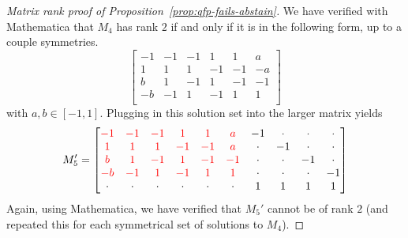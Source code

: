 \documentclass[anon]{colt2020} %
\newcommand{\Comments}{1}
\newcommand{\mynote}[2]{\ifnum\Comments=1\textcolor{#1}{#2}\fi}
\newcommand{\jessie}[1]{\mynote{purple}{[JF: #1]}}
\newcommand{\bo}[1]{\mynote{blue}{[Bo: #1]}}
\newcommand{\abstain}[1]{\mathrm{abstain}_{#1}}
\begin{document}
\begin{proof}[Matrix rank proof of Proposition~\ref{prop:qfp-fails-abstain}]
        We have verified with Mathematica that $M_4$ has rank $2$ if and only if it is in the following form, up to a couple symmetries.
	\[
	\begin{bmatrix}
	-1 & -1 & -1 & 1 & 1 & a \\
	1 & 1 & 1 & -1 & -1 & -a \\
	b & 1 & -1 & 1 & -1 & -1 \\
	-b & -1 & 1 & -1 & 1 & 1 \\
	\end{bmatrix}
	\] with $a, b \in [-1,1]$.
	Plugging in this solution set into the larger matrix yields
	\[
        M_5' =
	\begin{bmatrix}
	{\color{red} -1} & {\color{red} -1} & {\color{red} -1} & {\color{red} 1} & {\color{red} 1} & {\color{red} a} & -1 & \cdot & \cdot & \cdot \\
	{\color{red} 1} & {\color{red} 1} & {\color{red} 1} & {\color{red} -1} & {\color{red} -1} & {\color{red} a} & \cdot & -1 & \cdot & \cdot \\
	{\color{red} b} & {\color{red} 1} & {\color{red} -1} & {\color{red} 1} & {\color{red} -1} & {\color{red} -1} & \cdot & \cdot & -1 & \cdot \\
	{\color{red} -b} & {\color{red} -1} & {\color{red} 1} & {\color{red} -1} & {\color{red} 1} & {\color{red} 1} & \cdot & \cdot & \cdot & -1 \\
	\cdot & \cdot & \cdot & \cdot & \cdot & \cdot & 1 & 1 & 1 & 1\\
	\end{bmatrix}
	\]
        Again, using Mathematica, we have verified that $M_5'$ cannot be of rank $2$ (and repeated this for each symmetrical set of solutions to $M_4$).
        
	
\end{proof}



\end{document}
